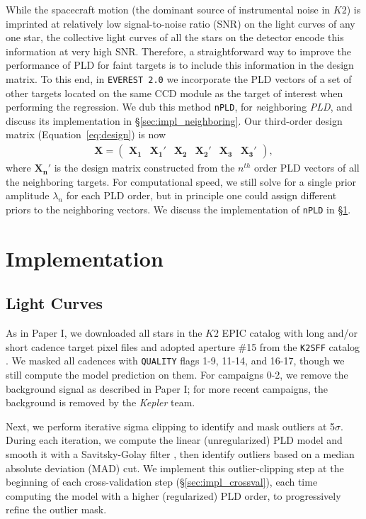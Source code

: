 \documentclass[]{aastex62}
\begin{document}
While the spacecraft motion (the dominant source of instrumental noise in $K2$) is imprinted at relatively
low signal-to-noise ratio (SNR) on the light curves
of any one star, the collective light curves of all the stars on the detector encode
this information at very high SNR. Therefore, a straightforward way to improve the performance of PLD
for faint targets is to include this information in the design matrix. To this end, in \texttt{EVEREST 2.0} we
incorporate the PLD vectors of a set of other targets located on the same CCD module as the target of interest
when performing the regression.
We dub
this method \texttt{nPLD}, for \emph{n}eighboring
\emph{PLD}, and discuss its implementation in \S\ref{sec:impl_neighboring}. Our third-order design
matrix (Equation~\ref{eq:design}) is now
%
\begin{align}
\label{eq:design_nPLD}
\mathbf{X} =
\left(
\begin{array}{cccccc}
  \mathbf{X_1} & \mathbf{X_1'} & \mathbf{X_2} & \mathbf{X_2'} & \mathbf{X_3} & \mathbf{X_3'}
\end{array}
\right),
\end{align}
%
where $\mathbf{X_n'}$ is the design matrix constructed from the $n^{th}$ order PLD vectors of all the
neighboring targets. For computational speed, we still solve for a single prior amplitude $\lambda_n$
for each PLD order, but in principle one could assign different priors to the neighboring vectors. We
discuss the implementation of \texttt{nPLD} in \S\ref{sec:implementation}.

\section{Implementation}
\label{sec:implementation}

\subsection{Light Curves}
\label{sec:impl_lightcurves}
As in Paper I, we downloaded all stars in the $K2$ EPIC catalog with long and/or short cadence
target pixel files and adopted aperture \#15
from the \texttt{K2SFF} catalog \citep{Vanderburg14,VanderburgJohnson14}. We masked all
cadences with \texttt{QUALITY} flags 1-9, 11-14, and 16-17, though we still compute the
model prediction on them. For campaigns 0-2, we remove the background signal as
described in Paper I; for more recent campaigns, the background is removed by the \emph{Kepler}
team.

Next, we perform iterative sigma clipping to identify and mask outliers at 5$\sigma$.
During each iteration, we compute the linear (unregularized) PLD model and smooth it with
a Savitsky-Golay filter \citep{SavitskyGolay64}, then identify outliers based on a
median absolute deviation (MAD) cut. We implement this outlier-clipping step at the
beginning of each cross-validation step (\S\ref{sec:impl_crossval}), each time computing
the model with a higher (regularized) PLD order, to progressively refine the outlier mask.
\end{document}
